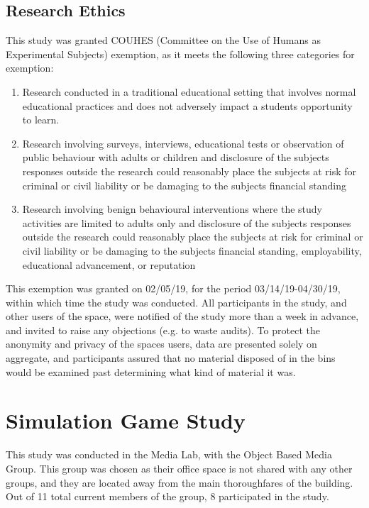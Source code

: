 \documentclass[nofonts,nols,justified,nobib]{tufte-book}
\begin{document}
\subsection*{Research Ethics}
This study was granted COUHES (Committee on the Use of Humans as Experimental Subjects) exemption, as it meets the following three categories for exemption:

\begin{enumerate}
  \item Research conducted in a traditional educational setting that involves normal educational practices and does not adversely impact a students opportunity to learn.
  \item Research involving surveys, interviews, educational tests or observation of public behaviour with adults or children and disclosure of the subjects responses outside the research could reasonably place the subjects at risk for criminal or civil liability or be damaging to the subjects financial standing
  \item Research involving benign behavioural interventions where the study activities are limited to adults only and disclosure of the subjects responses outside the research could reasonably place the subjects at risk for criminal or civil liability or be damaging to the subjects financial standing, employability, educational advancement, or reputation
\end{enumerate}

This exemption was granted on 02/05/19, for the period 03/14/19-04/30/19, within which time the study was conducted. All participants in the study, and other users of the space, were notified of the study more than a week in advance, and invited to raise any objections (e.g. to waste audits). To protect the anonymity and privacy of the spaces users, data are presented solely on aggregate, and participants assured that no material disposed of in the bins would be examined past determining what kind of material it was.

\newpage

\section*{Simulation Game Study}
This study was conducted in the Media Lab, with the Object Based Media Group. This group was chosen as their office space is not shared with any other groups, and they are located away from the main thoroughfares of the building. Out of 11 total current members of the group, 8 participated in the study.
\end{document}
